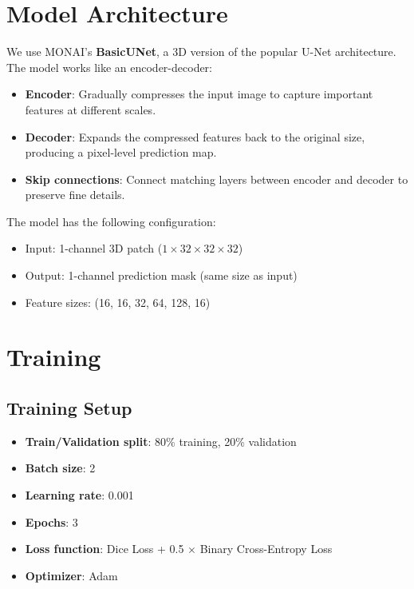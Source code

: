 \documentclass[conference]{IEEEtran}
\begin{document}
\section{Model Architecture}

We use MONAI's \textbf{BasicUNet}, a 3D version of the popular U-Net architecture. The model works like an encoder-decoder:

\begin{itemize}
    \item \textbf{Encoder}: Gradually compresses the input image to capture important features at different scales.
    \item \textbf{Decoder}: Expands the compressed features back to the original size, producing a pixel-level prediction map.
    \item \textbf{Skip connections}: Connect matching layers between encoder and decoder to preserve fine details.
\end{itemize}

The model has the following configuration:
\begin{itemize}
    \item Input: 1-channel 3D patch ($1 \times 32 \times 32 \times 32$)
    \item Output: 1-channel prediction mask (same size as input)
    \item Feature sizes: (16, 16, 32, 64, 128, 16)
\end{itemize}

\section{Training}

\subsection{Training Setup}

\begin{itemize}
    \item \textbf{Train/Validation split}: 80\% training, 20\% validation
    \item \textbf{Batch size}: 2
    \item \textbf{Learning rate}: 0.001
    \item \textbf{Epochs}: 3
    \item \textbf{Loss function}: Dice Loss + 0.5 $\times$ Binary Cross-Entropy Loss
    \item \textbf{Optimizer}: Adam
\end{itemize}
\end{document}
